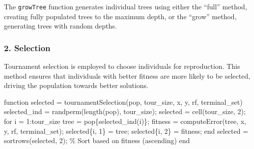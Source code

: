 \documentclass[
  letterpaper,
  DIV=11,
  numbers=noendperiod]{scrartcl}
\newenvironment{Shaded}{\begin{snugshade}}{\end{snugshade}}
\newcommand{\CommentTok}[1]{\textcolor[rgb]{0.37,0.37,0.37}{#1}}
\newcommand{\FloatTok}[1]{\textcolor[rgb]{0.68,0.00,0.00}{#1}}
\newcommand{\KeywordTok}[1]{\textcolor[rgb]{0.00,0.23,0.31}{#1}}
\newcommand{\NormalTok}[1]{\textcolor[rgb]{0.00,0.23,0.31}{#1}}
\newcommand{\OperatorTok}[1]{\textcolor[rgb]{0.37,0.37,0.37}{#1}}
\newcommand{\VariableTok}[1]{\textcolor[rgb]{0.07,0.07,0.07}{#1}}
\begin{document}
The \texttt{growTree} function generates individual trees using either
the ``full'' method, creating fully populated trees to the maximum
depth, or the ``grow'' method, generating trees with random depths.

\subsubsection{2. Selection}\label{selection}

Tournament selection is employed to choose individuals for reproduction.
This method ensures that individuals with better fitness are more likely
to be selected, driving the population towards better solutions.

\begin{Shaded}
\begin{Highlighting}[]
\KeywordTok{function} \VariableTok{selected} \OperatorTok{=} \VariableTok{tournamentSelection}\NormalTok{(}\VariableTok{pop}\OperatorTok{,} \VariableTok{tour\_size}\OperatorTok{,} \VariableTok{x}\OperatorTok{,} \VariableTok{y}\OperatorTok{,} \VariableTok{rf}\OperatorTok{,} \VariableTok{terminal\_set}\NormalTok{)}
    \VariableTok{selected\_ind} \OperatorTok{=} \VariableTok{randperm}\NormalTok{(}\VariableTok{length}\NormalTok{(}\VariableTok{pop}\NormalTok{)}\OperatorTok{,} \VariableTok{tour\_size}\NormalTok{)}\OperatorTok{;}
    \VariableTok{selected} \OperatorTok{=} \VariableTok{cell}\NormalTok{(}\VariableTok{tour\_size}\OperatorTok{,} \FloatTok{2}\NormalTok{)}\OperatorTok{;}
    \KeywordTok{for} \VariableTok{i} \OperatorTok{=} \FloatTok{1}\OperatorTok{:}\VariableTok{tour\_size}
        \VariableTok{tree} \OperatorTok{=} \VariableTok{pop}\NormalTok{\{}\VariableTok{selected\_ind}\NormalTok{(}\VariableTok{i}\NormalTok{)\}}\OperatorTok{;}
        \VariableTok{fitness} \OperatorTok{=} \VariableTok{computeError}\NormalTok{(}\VariableTok{tree}\OperatorTok{,} \VariableTok{x}\OperatorTok{,} \VariableTok{y}\OperatorTok{,} \VariableTok{rf}\OperatorTok{,} \VariableTok{terminal\_set}\NormalTok{)}\OperatorTok{;}
        \VariableTok{selected}\NormalTok{\{}\VariableTok{i}\OperatorTok{,} \FloatTok{1}\NormalTok{\} }\OperatorTok{=} \VariableTok{tree}\OperatorTok{;}
        \VariableTok{selected}\NormalTok{\{}\VariableTok{i}\OperatorTok{,} \FloatTok{2}\NormalTok{\} }\OperatorTok{=} \VariableTok{fitness}\OperatorTok{;}
    \KeywordTok{end}
    \VariableTok{selected} \OperatorTok{=} \VariableTok{sortrows}\NormalTok{(}\VariableTok{selected}\OperatorTok{,} \FloatTok{2}\NormalTok{)}\OperatorTok{;}  \CommentTok{\% Sort based on fitness (ascending)}
\KeywordTok{end}
\end{Highlighting}
\end{Shaded}
\end{document}
